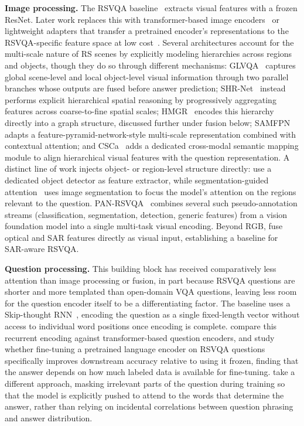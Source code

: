 \textbf{Image processing.} The RSVQA baseline~\cite{lobry2020rsvqa} extracts visual features with a frozen ResNet. Later work replaces this with transformer-based image encoders~\cite{bazi2022bimodal} or lightweight adapters that transfer a pretrained encoder's representations to the RSVQA-specific feature space at low cost~\cite{he2024pers}. Several architectures account for the multi-scale nature of RS scenes by explicitly modeling hierarchies across regions and objects, though they do so through different mechanisms: GLVQA~\cite{guo2022glvqa} captures global scene-level and local object-level visual information through two parallel branches whose outputs are fused before answer prediction; SHR-Net~\cite{zhang2023shrnet} instead performs explicit hierarchical spatial reasoning by progressively aggregating features across coarse-to-fine spatial scales; HMGR~\cite{zhang2024hmgr} encodes this hierarchy directly into a graph structure, discussed further under fusion below; SAMFPN~\cite{feng2024samfpn} adapts a feature-pyramid-network-style multi-scale representation combined with contextual attention; and CSCa~\cite{huang2024csca} adds a dedicated cross-modal semantic mapping module to align hierarchical visual features with the question representation. A distinct line of work injects object- or region-level structure directly: \textcite{felix2021crossmodal} use a dedicated object detector as feature extractor, while segmentation-guided attention~\cite{tosato2024segguided,wang2024earthvqanet} uses image segmentation to focus the model's attention on the regions relevant to the question. PAN-RSVQA~\cite{chappuis2025pan} combines several such pseudo-annotation streams (classification, segmentation, detection, generic features) from a vision foundation model into a single multi-task visual encoding. Beyond RGB, \textcite{tosato2025b} fuse optical and SAR features directly as visual input, establishing a baseline for SAR-aware RSVQA.

\textbf{Question processing.} This building block has received comparatively less attention than image processing or fusion, in part because RSVQA questions are shorter and more templated than open-domain VQA questions, leaving less room for the question encoder itself to be a differentiating factor. The baseline uses a Skip-thought RNN~\cite{kiros2015skipthought}, encoding the question as a single fixed-length vector without access to individual word positions once encoding is complete. \textcite{chappuis2022a} compare this recurrent encoding against transformer-based question encoders, and study whether fine-tuning a pretrained language encoder on RSVQA questions specifically improves downstream accuracy relative to using it frozen, finding that the answer depends on how much labeled data is available for fine-tuning. \textcite{li2024maskbased} take a different approach, masking irrelevant parts of the question during training so that the model is explicitly pushed to attend to the words that determine the answer, rather than relying on incidental correlations between question phrasing and answer distribution.

